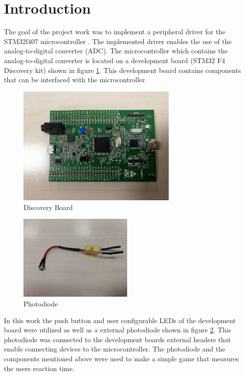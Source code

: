 \section{Introduction}
The goal of the project work was to implement a peripheral driver for the STM32f407 microcontroller \cite{RefManual}. The implemented driver enables the use of the analog-to-digital converter (ADC). The microcontroller which contains the analog-to-digital converter is located on a development board (STM32 F4 Discovery kit) shown in figure \ref{fig:Board}. This development board contains components that can be interfaced with the microcontroller.\\

\begin{figure}[htbp]
  \centering
     \includegraphics[width=0.7\textwidth]{./figures/board.jpg}
  \caption{Discovery Board}
  \label{fig:Board}
\end{figure}

\begin{figure}[htbp]
  \centering
     \includegraphics[width=0.5\textwidth]{./figures/photodiode.jpg}
  \caption{Photodiode}
  \label{fig:photodiode}
\end{figure}

\par
In this work the push button and user configurable LEDs of the development board were utilized as well as a external photodiode shown in figure \ref{fig:photodiode}. This photodiode was connected to the development boards external headers that enable connecting devices to the microcontroller. The photodiode and the components mentioned above were used to make a simple game that measures the users reaction time.

